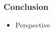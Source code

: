 \begin{frame}
  \frametitle{Conclusion}

  \begin{itemize}
    \item Perspective
  \end{itemize}

\end{frame}